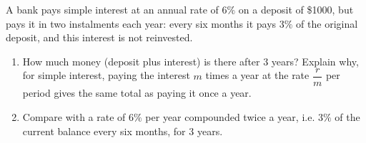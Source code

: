 A bank pays simple interest at an annual rate of $6\%$ on a deposit of \$1000, but pays it in two instalments each year: every six months it pays $3\%$ of the original deposit, and this interest is not reinvested.
\begin{enumerate}
\item[(a)] How much money (deposit plus interest) is there after $3$ years? Explain why, for simple interest, paying the interest $m$ times a year at the rate $\dfrac rm$ per period gives the same total as paying it once a year.
\item[(b)] Compare with a rate of $6\%$ per year compounded twice a year, i.e. $3\%$ of the current balance every six months, for $3$ years.
\end{enumerate}
